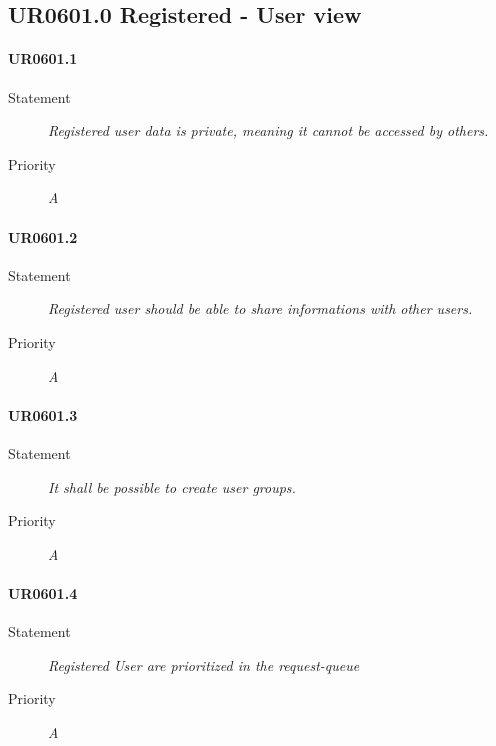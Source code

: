 \subsection{UR0601.0 Registered - User view}


\paragraph{UR0601.1}
\begin{description}
\item [Statement] \textit{
Registered user data is private, meaning it cannot be accessed by others.
}
\item [Priority] \textit{A}
\end{description}

\paragraph{UR0601.2}
\begin{description}
\item [Statement] \textit{
Registered user should be able to share informations with other users.
}
\item [Priority] \textit{A}
\end{description}

\paragraph{UR0601.3}
\begin{description}
\item [Statement] \textit{
It shall be possible to create user groups.
}
\item [Priority] \textit{A}
\end{description}

\paragraph{UR0601.4}
\begin{description}
\item [Statement] \textit{
Registered User are prioritized in the request-queue
}
\item [Priority] \textit{A}
\end{description}

